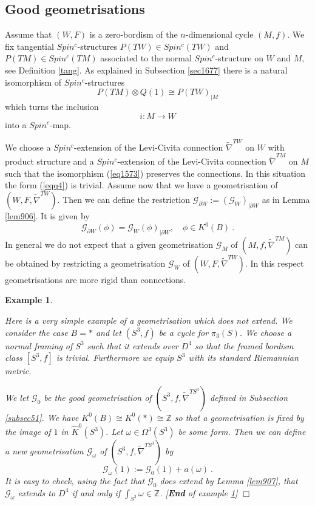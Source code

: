 \documentclass[12pt]{article}
\newtheorem{ex}[theorem]{Example}
\newcommand{\cG}{{\mathcal{G}}}
\def\hB{\hspace*{\fill}$\Box$ \newline\noindent}
\newcommand{\Z}{{\mathbb{Z}}}
\begin{document}
 
\subsection{Good geometrisations}\label{sec801}

Assume that $(W,F)$ is a zero-bordism of the $n$-dimensional cycle $(M,f)$. 
We fix tangential  $Spin^{c}$-structures $P(TW)\in Spin^{c}(TW)$ and $P(TM)\in Spin^{c}(TM)$ associated to  the normal $Spin^{c}$-structure on $W$ and $M$, see Definition \ref{tang}.  As explained in Subsection \ref{sec1677} there is a natural   isomorphism  of $Spin^{c}$-structures
 \begin{equation}\label{eq1573}P(TM)\otimes Q(1)\cong P(TW)_{|M}\end{equation}
 which turns the inclusion $$i :M\to W$$ into a  $Spin^{c}$-map.
 
We choose a $Spin^{c}$-extension of the Levi-Civita connection
$\tilde \nabla^{TW}$ on $W$ with product structure and a  $Spin^{c}$-extension of the Levi-Civita connection $\tilde \nabla^{TM}$ on $M$ such that the isomorphism (\ref{eq1573}) preserves the connections. In this situation  the form (\ref{eqq4}) is trivial.
Assume now that we have a geometrisation of $(W,F,\tilde \nabla^{TW})$.
Then we can define the restriction
$\cG_{\partial W}:=(\cG_{W})_{|\partial W}$ as in Lemma \ref{lem906}. It is given by
\begin{equation}\label{eqq6}\cG_{\partial W}(\phi)=\cG_{W}(\phi)_{|\partial W}, \quad \phi\in K^{0}(B)\ .\end{equation}
 In general we do not expect that a given geometrisation $\cG_{M}$ of $(M,f,\tilde \nabla^{TM})$
 can be obtained by restricting  a geometrisation $\cG_{W}$ of $(W,F,\tilde \nabla^{TW})$. In this respect geometrisations are more rigid than connections.

\begin{ex}\label{nonexr}{\rm

Here is a very simple example of a geometrisation which does not extend. We consider the case $B=*$ and let $(S^{3},f)$  be a cycle for $\pi_{3}(S)$.   We choose a normal framing of $S^{3}$ such that  it extends over $D^{4}$ so that the  framed bordism class $[S^{3},f]$ is trivial. Furthermore we equip $S^{3}$ with its standard Riemannian metric.
 
 We let $\cG_{0}$ be the good geometrisation of $(S^{3},f,\tilde \nabla^{TS^{3}})$
defined  in Subsection \ref{subsec51}. 
We have
$K^{0}(B)\cong  K^{0}(*)\cong \Z$ so that a geometrisation is fixed by the image of $1$ in 
$\hat K^{0}(S^{3})$.  
Let $\omega\in \Omega^{3}(S^{3})$ be some form. Then we can define a new geometrisation
$\cG_{\omega}$ of $(S^{3},f,\tilde \nabla^{TS^{3}})$ by $$\cG_{\omega}(1):=\cG_{0}(1)+a(\omega)\ .$$ It is easy to check,  using the fact that $\cG_{0}$ does extend by Lemma \ref{lem907},  that $\cG_{\omega}$  extends to  $D^{4}$ if and only if  $\int_{S^{3}}\omega\in \Z$.
[\textbf{End} of example \ref{nonexr}] \hB}\end{ex}
\end{document}
